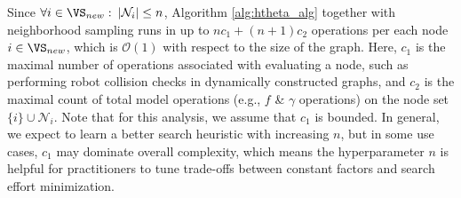  Since $\forall i \in \VS_{new}: \: |\mathcal{N}_i| \leq n$, Algorithm \ref{alg:htheta_alg} together with neighborhood sampling runs in up to $nc_1 + (n+1)c_2$ operations per each node $i \in \VS_{new}$, which is $\mathcal{O}(1)$ with respect to the size of the graph. Here, $c_1$ is the maximal number of operations associated with evaluating a node, such as performing robot collision checks in dynamically constructed graphs, and $c_2$ is the maximal count of total model operations (e.g., $f$ \& $\gamma$ operations) on the node set $\{i\} \cup \mathcal{N}_i$. Note that for this analysis, we assume that $c_1$ is bounded. In general, we expect to learn a better search heuristic with increasing $n$, but in some use cases, $c_1$ may dominate overall complexity, which means the hyperparameter $n$ is helpful for practitioners to tune trade-offs between constant factors and search effort minimization.
